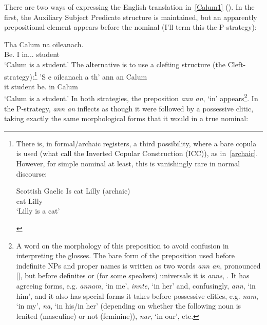 \documentclass[output=paper]{langsci/langscibook}
\begin{document}
\ea {}
    \label{Calum1}
\z
There are two ways of expressing the English translation in~\eqref{Calum1}
(\citealt{cram:83,schreiner:15}). In the first, the Auxiliary
Subject Predicate structure is maintained,  but an apparently prepositional
element appears before the nominal (I'll term this the P-strategy):\newpage

\ea {}
\sn
\gll Tha  Calum  na  oileanach.\\
Be.\Prs{}  I  in.\Poss{}.\Tsg{}.\M{}  student \\
\glt \enquote*{Calum is a student.}
\z
The alternative is to use a clefting structure (the
Cleft-strategy):\footnote{\label{icc}There is, in formal/archaic registers, a
    third possibility, where a bare copula is used (what
    \citealt{adger-ramchand:03} call the Inverted Copular Construction (ICC)),
    as in~\eqref{archaic}. However, for simple nominal  at least, this
    is vanishingly rare in normal discourse:

\begin{exe}\label{archaic}
    Scottish Gaelic
    \sn
\gll Is cat Lilly \hfill (archaic)\\
\Cop{} cat Lilly\\
\glt \enquote*{Lilly is a cat}
\end{exe}}
\ea
\gll 'S e oileanach a th' {ann an} Calum\\
\Cop{} it student \Rel{} be.\Prs{} in Calum\\
\glt \enquote*{Calum is a student.}
\z
In both strategies, the preposition \emph{ann an}, `in' appears\footnote{A word
on the morphology of this preposition to avoid confusion in interpreting the
glosses. The bare form of the preposition used before indefinite NPs and proper
names is written as two words \emph{ann an}, pronounced [], but
before definites or (for some speakers) universals it is \emph{anns},
. It has agreeing forms, e.g. \emph{annam}, `in me', \emph{innte},
`in her' and, confusingly, \emph{ann}, `in him', and it also has special forms
it takes before possessive clitics, e.g. \emph{nam}, `in my', \emph{na}, `in
his/in her' (depending on whether the following noun is lenited (masculine) or
not (feminine)), \emph{nar}, `in our', etc.}. In the P-strategy, \emph{ann an}
inflects as though it were followed by a possessive clitic, taking exactly the
same morphological forms that it would in a true nominal:
\end{document}
